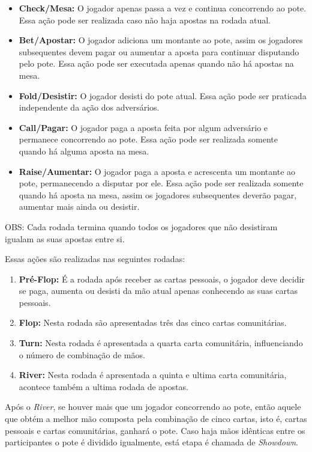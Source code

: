 \documentclass[
	12pt,				%
	oneside,			%
	a4paper,			%
	chapter=TITLE,		%
	section=TITLE,		%
	subsection=Title,	%
	subsubsection=Title,%
	brazil,				%
	]{abntex2}
\begin{document}
\begin{itemize}
	\item \textbf{Check/Mesa:} O jogador apenas passa a vez e continua concorrendo ao pote. Essa ação pode ser realizada caso não haja apostas na rodada atual. 
	\item \textbf{Bet/Apostar:} O jogador adiciona um montante ao pote, assim os jogadores subsequentes devem pagar ou aumentar a aposta para continuar disputando pelo pote. Essa ação pode ser executada apenas quando não há apostas na mesa.
	\item \textbf{Fold/Desistir:} O jogador desisti do pote atual. Essa ação pode ser praticada independente da ação dos adversários.
	\item \textbf{Call/Pagar:} O jogador paga a aposta feita por algum adversário e permanece concorrendo ao pote. Essa ação pode ser realizada somente quando há alguma aposta na mesa.
	\item \textbf{Raise/Aumentar:} O jogador paga a aposta e acrescenta um montante ao pote, permanecendo a disputar por ele. Essa ação pode ser realizada somente quando há aposta na mesa, assim os jogadores subsequentes deverão pagar, aumentar mais ainda ou desistir.
\end{itemize}

OBS: Cada rodada termina quando todos os jogadores que não desistiram igualam as suas apostas entre si.

Essas ações são realizadas nas seguintes rodadas:
\begin{enumerate}
	\item \textbf{Pré-Flop:} É a rodada após receber as cartas pessoais, o jogador deve decidir se paga, aumenta ou desisti da mão atual apenas conhecendo as suas cartas pessoais.
	\item \textbf{Flop:} Nesta rodada são apresentadas três das cinco cartas comunitárias. 
	\item \textbf{Turn:} Nesta rodada é apresentada a quarta carta comunitária, influenciando o número de combinação de mãos. 
	\item \textbf{River:} Nesta rodada é apresentada a quinta e ultima carta comunitária, acontece também a ultima rodada de apostas.
\end{enumerate}

Após o \textit{River}, se houver mais que um jogador concorrendo ao pote, então aquele que obtém a melhor mão composta pela combinação de cinco cartas, isto é, cartas pessoais e cartas comunitárias, ganhará o pote. Caso haja mãos idênticas entre os participantes o pote é dividido igualmente, está etapa é chamada de \textit{Showdown}. 
\end{document}
